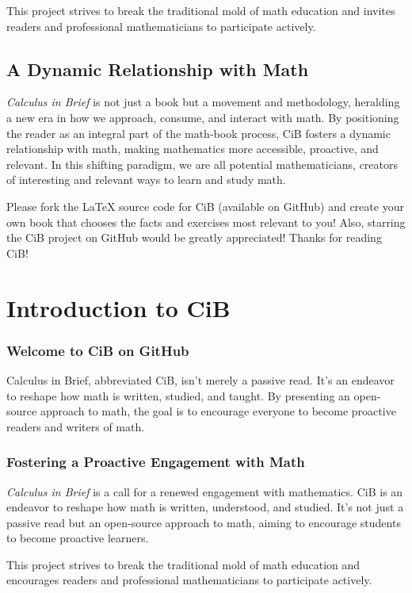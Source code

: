 \documentclass[a4paper,12pt]{book}
\begin{document}
This project strives to break the traditional mold of math education and invites readers and professional mathematicians to participate actively.

\section*{A Dynamic Relationship with Math}
\emph{Calculus in Brief} is not just a book but a movement and methodology, heralding a new era in how we approach, consume, and interact with math. By positioning the reader as an integral part of the math-book process, CiB fosters a dynamic relationship with math, making mathematics more accessible, proactive, and relevant. In this shifting paradigm, we are all potential mathematicians, creators of interesting and relevant ways to learn and study math.

Please fork the LaTeX source code for CiB (available on GitHub) and create your own book that chooses the facts and exercises most relevant to you! Also, starring the CiB project on GitHub would be greatly appreciated! Thanks for reading CiB!

\chapter{Introduction to CiB}
\subsection*{Welcome to CiB on GitHub}
Calculus in Brief, abbreviated CiB, isn't merely a passive read. It's an endeavor to reshape how math is written, studied, and taught. By presenting an open-source approach to math, the goal is to encourage everyone to become proactive readers and writers of math. 

\subsection*{Fostering a Proactive Engagement with Math}

\emph{Calculus in Brief} is a call for a renewed engagement with mathematics. CiB is an endeavor to reshape how math is written, understood, and studied. It's not just a passive read but an open-source approach to math, aiming to encourage students to become proactive learners.

This project strives to break the traditional mold of math education and encourages readers and professional mathematicians to participate actively.
\end{document}
